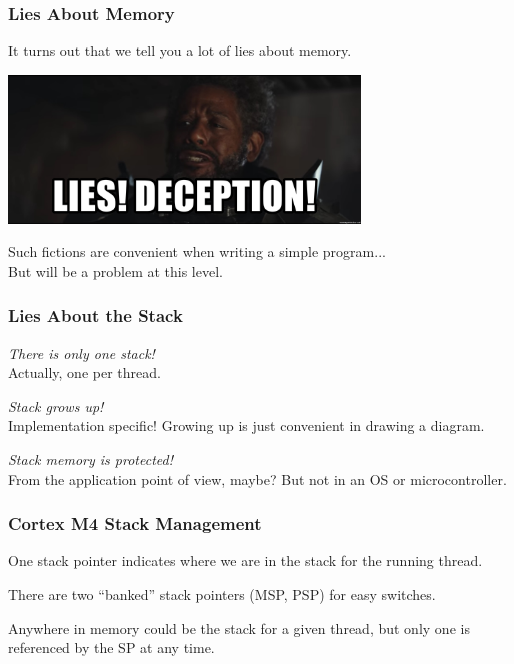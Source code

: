 \begin{frame}
\frametitle{Lies About Memory}

It turns out that we tell you a lot of lies about memory.

\begin{center}
  \includegraphics[width=0.7\textwidth]{images/liesdeception}
\end{center}

Such fictions are convenient when writing a simple program...\\
\quad But will be a problem at this level.

\end{frame}

\begin{frame}
\frametitle{Lies About the Stack}

\textit{There is only one stack!}\\
\quad Actually, one per thread.

\textit{Stack grows up!}\\
\quad Implementation specific! Growing up is just convenient in drawing a diagram.

\textit{Stack memory is protected!}\\
\quad From the application point of view, maybe? But not in an OS or microcontroller.

\end{frame}

\begin{frame}
\frametitle{Cortex M4 Stack Management}

One stack pointer indicates where we are in the stack for the running thread.

There are two ``banked'' stack pointers (MSP, PSP) for easy switches.

Anywhere in memory could be the stack for a given thread, but only one is referenced by the SP at any time.

\end{frame}

